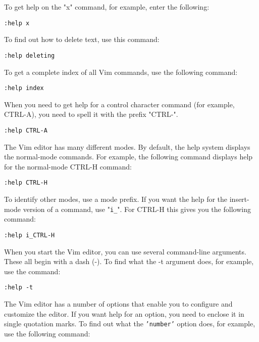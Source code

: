 To get help on the "x" command, for example, enter the following:

 \begin{Verbatim}[samepage=true]
 :help x
 \end{Verbatim}

To find out how to delete text, use this command:

 \begin{Verbatim}[samepage=true]
 :help deleting
 \end{Verbatim}

To get a complete index of all Vim commands, use the following command:

 \begin{Verbatim}[samepage=true]
 :help index
 \end{Verbatim}

When you need to get help for a control character command (for example, CTRL-A), you need to spell it with the prefix "CTRL-".

 \begin{Verbatim}[samepage=true]
 :help CTRL-A
 \end{Verbatim}

The Vim editor has many different modes.
By default, the help system displays the normal-mode commands.
For example, the following command displays help for the normal-mode CTRL-H command: 

 \begin{Verbatim}[samepage=true]
 :help CTRL-H
 \end{Verbatim}

To identify other modes, use a mode prefix.
If you want the help for the insert-mode version of a command, use "\texttt{i\_}".
For CTRL-H this gives you the following command: 

 \begin{Verbatim}[samepage=true]
 :help i_CTRL-H
 \end{Verbatim}

When you start the Vim editor, you can use several command-line arguments.
These all begin with a dash (-).
To find what the -t argument does, for example, use the command: 

 \begin{Verbatim}[samepage=true]
 :help -t
 \end{Verbatim}

The Vim editor has a number of options that enable you to configure and customize the editor.
If you want help for an option, you need to enclose it in single quotation marks.
To find out what the \texttt{'number'} option does, for example, use the following command: 

